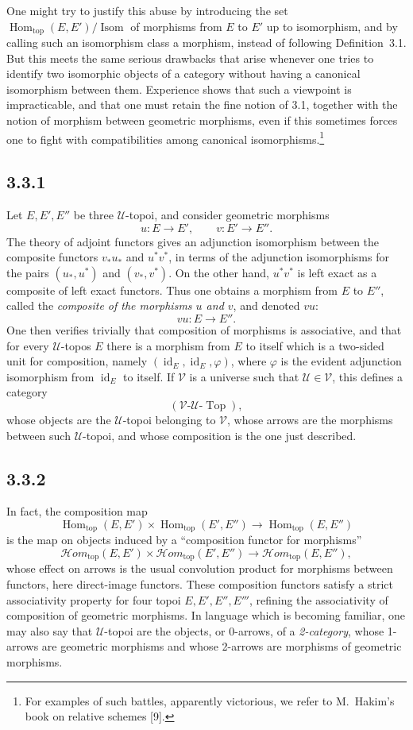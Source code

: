 \documentclass[11pt]{article}
\newcommand{\U}{\mathcal{U}}
\newcommand{\V}{\mathcal{V}}
\newcommand{\Top}{\operatorname{Top}}
\newcommand{\id}{\operatorname{id}}
\newcommand{\Hhomtop}{\mathcal{H}om_{\mathrm{top}}}
\newcommand{\Homtop}{\operatorname{Hom}_{\mathrm{top}}}
\begin{document}
One might try to justify this abuse by introducing the set \(\Homtop(E,E')/\operatorname{Isom}\) of morphisms from \(E\) to \(E'\) up to isomorphism, and by calling such an isomorphism class a morphism, instead of following Definition~3.1. But this meets the same serious drawbacks that arise whenever one tries to identify two isomorphic objects of a category without having a canonical isomorphism between them. Experience shows that such a viewpoint is impracticable, and that one must retain the fine notion of 3.1, together with the notion of morphism between geometric morphisms, even if this sometimes forces one to fight with compatibilities among canonical isomorphisms.\footnote{For examples of such battles, apparently victorious, we refer to M.~Hakim's book on relative schemes [9].}

\subsection*{3.3.1}
Let \(E,E',E''\) be three \(\U\)-topoi, and consider geometric morphisms
\[
u:E\longrightarrow E',
\qquad
v:E'\longrightarrow E''.
\]
The theory of adjoint functors gives an adjunction isomorphism between the composite functors \(v_\ast u_\ast\) and \(u^\ast v^\ast\), in terms of the adjunction isomorphisms for the pairs \((u_\ast,u^\ast)\) and \((v_\ast,v^\ast)\). On the other hand, \(u^\ast v^\ast\) is left exact as a composite of left exact functors. Thus one obtains a morphism from \(E\) to \(E''\), called the \emph{composite of the morphisms \(u\) and \(v\)}, and denoted \(vu\):
\[
vu:E\longrightarrow E''.
\]
One then verifies trivially that composition of morphisms is associative, and that for every \(\U\)-topos \(E\) there is a morphism from \(E\) to itself which is a two-sided unit for composition, namely \((\id_E,\id_E,\varphi)\), where \(\varphi\) is the evident adjunction isomorphism from \(\id_E\) to itself. If \(\V\) is a universe such that \(\U\in\V\), this defines a category
\[
(\V\text{-}\U\text{-}\Top),
\]
whose objects are the \(\U\)-topoi belonging to \(\V\), whose arrows are the morphisms between such \(\U\)-topoi, and whose composition is the one just described.

\subsection*{3.3.2}
In fact, the composition map
\[
\Homtop(E,E')\times\Homtop(E',E'')\longrightarrow\Homtop(E,E'')
\]
is the map on objects induced by a ``composition functor for morphisms''
\[
\Hhomtop(E,E')\times\Hhomtop(E',E'')\longrightarrow\Hhomtop(E,E''),
\]
whose effect on arrows is the usual convolution product for morphisms between functors, here direct-image functors. These composition functors satisfy a strict associativity property for four topoi \(E,E',E'',E'''\), refining the associativity of composition of geometric morphisms. In language which is becoming familiar, one may also say that \(\U\)-topoi are the objects, or 0-arrows, of a \emph{2-category}, whose 1-arrows are geometric morphisms and whose 2-arrows are morphisms of geometric morphisms.
\end{document}
